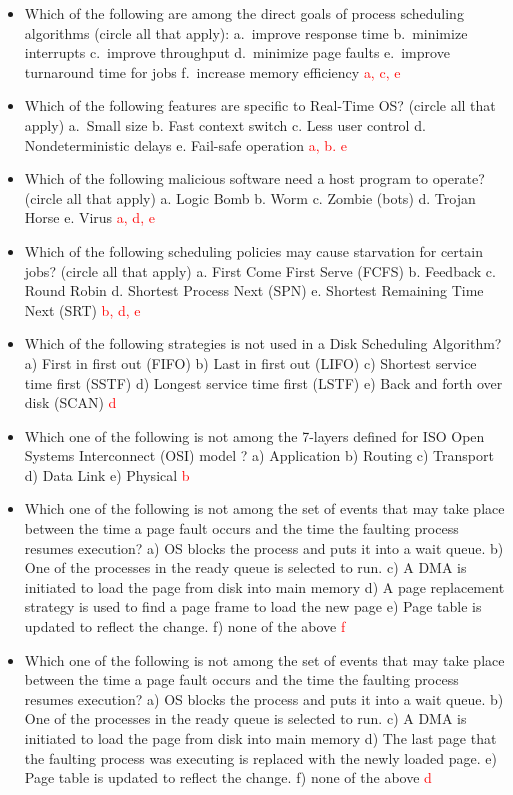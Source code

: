 \documentclass[9pt,landscape]{memoir}
\newcommand{\answer}[1]{\textcolor{red}{#1}}
\begin{document}
\begin{multicols}{6}
\begin{itemize}
    \item Which of the following are among the direct goals of process scheduling algorithms (circle all that apply): a.~improve response time b.~minimize interrupts c.~improve throughput d.~minimize page faults e.~improve turnaround time for jobs f.~increase memory efficiency \answer{a, c, e}
    \item Which of the following features are specific to Real-Time OS? (circle all that apply) a.~Small size b. Fast context switch c. Less user control d. Nondeterministic delays e. Fail-safe operation \answer{a, b. e}
    \item Which of the following malicious software need a host program to operate? (circle all that apply) a. Logic Bomb b. Worm c. Zombie (bots) d. Trojan Horse e. Virus \answer{a, d, e}
    \item Which of the following scheduling policies may cause starvation for certain jobs? (circle all that apply) a. First Come First Serve (FCFS) b. Feedback c. Round Robin d. Shortest Process Next (SPN) e. Shortest Remaining Time Next (SRT) \answer{b, d, e}
    \item Which of the following strategies is not used in a Disk Scheduling Algorithm? a) First in first out (FIFO) b) Last in first out (LIFO) c) Shortest service time first (SSTF) d) Longest service time first (LSTF) e) Back and forth over disk (SCAN) \answer{d}
    \item Which one of the following is not among the 7-layers defined for ISO Open Systems Interconnect (OSI) model ? a) Application b) Routing c) Transport d) Data Link e) Physical \answer{b}
    \item Which one of the following is not among the set of events that may take place between the time a page fault occurs and the time the faulting process resumes execution? a) OS blocks the process and puts it into a wait queue. b) One of the processes in the ready queue is selected to run. c) A DMA is initiated to load the page from disk into main memory d) A page replacement strategy is used to find a page frame to load the new page e) Page table is updated to reflect the change. f) none of the above \answer{f}
    \item Which one of the following is not among the set of events that may take place between the time a page fault occurs and the time the faulting process resumes execution? a) OS blocks the process and puts it into a wait queue. b) One of the processes in the ready queue is selected to run. c) A DMA is initiated to load the page from disk into main memory d) The last page that the faulting process was executing is replaced with the newly loaded page. e) Page table is updated to reflect the change. f) none of the above \answer{d}

\end{itemize}
\end{multicols}
\end{document}
